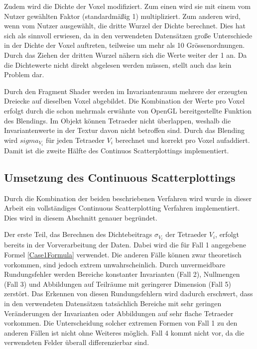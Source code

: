 \documentclass[a4paper,fontsize=12pt,toc=bib,halfparskip]{scrartcl}
\begin{document}
Zudem wird die Dichte der Voxel modifiziert. Zum einen wird sie mit einem vom Nutzer gew\"ahlten Faktor (standardm\"a{\ss}ig 1) multipliziert. Zum anderen wird, wenn vom Nutzer ausgew\"ahlt, die dritte Wurzel der Dichte berechnet. Dies hat sich als sinnvoll erwiesen, da in den verwendeten Datens\"atzen gro{\ss}e Unterschiede in der Dichte der Voxel auftreten, teilweise um mehr als 10 Gr\"o{ss}enordnungen. Durch das Ziehen der dritten Wurzel n\"ahern sich die Werte weiter der 1 an. Da die Dichtewerte nicht direkt abgelesen werden m\"ussen, stellt auch das kein Problem dar. 

Durch den Fragment Shader werden im Invariantenraum mehrere der erzeugten Dreiecke auf dieselben Voxel abgebildet. Die Kombination der Werte pro Voxel erfolgt durch die schon mehrmals erw\"ahnte von OpenGL bereitgestellte Funktion des Blendings. Im Objekt k\"onnen Tetraeder nicht \"uberlappen, weshalb die Invariantenwerte in der Textur davon nicht betroffen sind. Durch das Blending wird $sigma_{V_i}$ f\"ur jeden Tetraeder $V_i$ berechnet und korrekt pro Voxel aufaddiert. Damit ist die zweite H\"alfte des Continuos Scatterplottings implementiert.

\subsection{Umsetzung des Continuous Scatterplottings}
\label{CSPImplementation}
Durch die Kombination der beiden beschriebenen Verfahren wird wurde in dieser Arbeit ein vollst\"andiges Continuous Scatterplotting Verfahren implementiert. Dies wird in diesem Abschnitt genauer begr\"undet.

Der erste Teil, das Berechnen des Dichtebeitrags $\sigma_{V_i}$ der Tetraeder $V_i$, erfolgt bereits in der Vorverarbeitung der Daten. Dabei wird die f\"ur Fall 1 angegebene Formel \ref{Case1Formula} verwendet. Die anderen F\"alle k\"onnen zwar theoretisch vorkommen, sind jedoch extrem unwahrscheinlich. Durch unvermeidbare Rundungsfehler werden Bereiche konstanter Invarianten (Fall 2), Nullmengen (Fall 3) und Abbildungen auf Teilr\"aume mit geringerer Dimension (Fall 5) zerst\"ort. Das Erkennen von diesen Rundungsfehlern wird dadurch erschwert, dass in den verwendeten Datens\"atzen tats\"achlich Bereiche mit sehr geringen Ver\"anderungen der Invarianten oder Abbildungen auf sehr flache Tetraeder vorkommen. Die Unterscheidung solcher extremen Formen von Fall 1 zu den anderen F\"allen ist nicht ohne Weiteres m\"oglich. Fall 4 kommt nicht vor, da die verwendeten Felder \"uberall differenzierbar sind.
\end{document}
